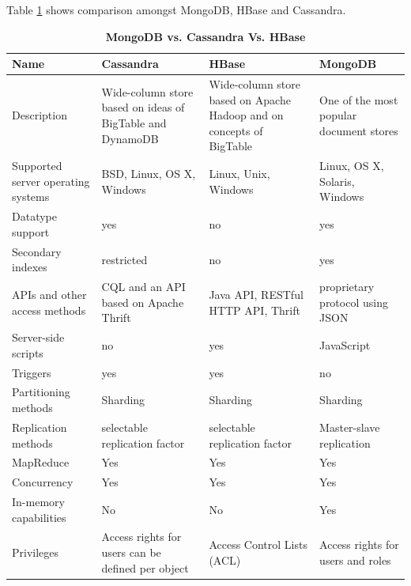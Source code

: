 \documentclass[9pt,twocolumn,twoside]{../../styles/osajnl}
\begin{document}
\begin{table}[htbp]
  Table \ref{tab:DB compare} shows comparison amongst MongoDB, HBase and Cassandra. \cite{www-mongo10}
  
\begin{center}
\caption{\bf MongoDB vs. Cassandra Vs. HBase}
\begin{tabular}{ m{5em} m{2cm} m{2cm} m{2cm} } 
\hline
Name & Cassandra & HBase & MongoDB \\ 
\hline
Description & Wide-column store based on ideas of BigTable and DynamoDB &
Wide-column store based on Apache Hadoop and on concepts of BigTable &
One of the most popular document stores \\ 

Supported server operating systems & BSD, Linux, OS X, Windows &
Linux, Unix, Windows & Linux, OS X, Solaris, Windows \\

Datatype support & yes & no & yes \\

Secondary indexes & restricted & no & yes \\

APIs and other access methods & CQL and an API based on Apache Thrift
& Java API, RESTful HTTP API, Thrift & proprietary protocol using JSON
\\

Server-side scripts & no & yes & JavaScript \\

Triggers & yes & yes & no \\

Partitioning methods & Sharding & Sharding & Sharding \\

Replication methods & selectable replication factor & selectable
replication factor & Master-slave replication \\

MapReduce & Yes & Yes & Yes \\ 

Concurrency & Yes & Yes & Yes \\

In-memory capabilities & No & No & Yes \\ 

Privileges & Access rights for users can be defined per object &
Access Control Lists (ACL) & Access rights for users and roles \\

\hline
\end{tabular}
  \label{tab:DB compare}
\end{center}
\end{table} 
\end{document}
